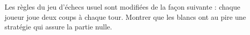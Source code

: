 Les règles du jeu d'échecs usuel sont modifiées de la façon suivante : chaque joueur joue deux coups à chaque tour. Montrer que les blancs ont au pire une stratégie qui assure la partie nulle.
